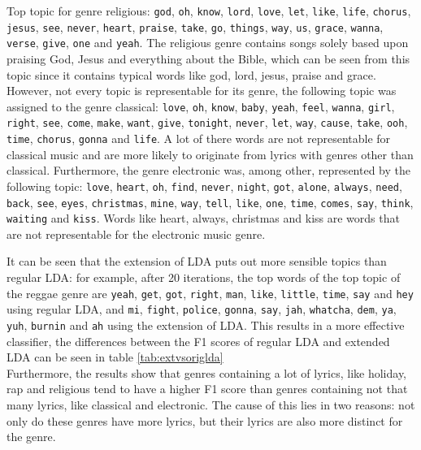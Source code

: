 Top topic for genre religious: \verb|god|, \verb|oh|, \verb|know|, \verb|lord|, \verb|love|, \verb|let|, \verb|like|, \verb|life|, \verb|chorus|, \verb|jesus|, \verb|see|, \verb|never|, \verb|heart|, \verb|praise|, \verb|take|, \verb|go|, \verb|things|, \verb|way|, \verb|us|, \verb|grace|, \verb|wanna|, \verb|verse|, \verb|give|, \verb|one| and \verb|yeah|. The religious genre contains songs solely based upon praising God, Jesus and everything about the Bible, which can be seen from this topic since it contains typical words like god, lord, jesus, praise and grace. \\
However, not every topic is representable for its genre, the following topic was assigned to the genre classical: \verb|love|, \verb|oh|, \verb|know|, \verb|baby|, \verb|yeah|, \verb|feel|, \verb|wanna|, \verb|girl|, \verb|right|, \verb|see|, \verb|come|, \verb|make|, \verb|want|, \verb|give|, \verb|tonight|, \verb|never|, \verb|let|, \verb|way|, \verb|cause|, \verb|take|, \verb|ooh|, \verb|time|, \verb|chorus|, \verb|gonna| and \verb|life|. A lot of there words are not representable for classical music and are more likely to originate from lyrics with genres other than classical. Furthermore, the genre electronic was, among other, represented by the following topic: \verb|love|, \verb|heart|, \verb|oh|, \verb|find|, \verb|never|, \verb|night|, \verb|got|, \verb|alone|, \verb|always|, \verb|need|, \verb|back|, \verb|see|, \verb|eyes|, \verb|christmas|, \verb|mine|, \verb|way|, \verb|tell|, \verb|like|, \verb|one|, \verb|time|, \verb|comes|, \verb|say|, \verb|think|, \verb|waiting| and \verb|kiss|. Words like heart, always, christmas and kiss are words that are not representable for the electronic music genre.


It can be seen that the extension of LDA puts out more sensible topics than regular LDA: for example, after 20 iterations, the top words of the top topic of the reggae genre are \verb|yeah|, \verb|get|, \verb|got|, \verb|right|, \verb|man|, \verb|like|, \verb|little|, \verb|time|, \verb|say| and \verb|hey| using regular LDA, and \verb|mi|, \verb|fight|, \verb|police|, \verb|gonna|, \verb|say|, \verb|jah|, \verb|whatcha|, \verb|dem|, \verb|ya|, \verb|yuh|, \verb|burnin| and \verb|ah| using the extension of LDA. This results in a more effective classifier, the differences between the F1 scores of regular LDA and extended LDA can be seen in table \ref{tab:extvsoriglda} \\
Furthermore, the results show that genres containing a lot of lyrics, like holiday, rap and religious tend to have a higher F1 score than genres containing not that many lyrics, like classical and electronic. The cause of this lies in two reasons: not only do these genres have more lyrics, but their lyrics are also more distinct for the genre. 


